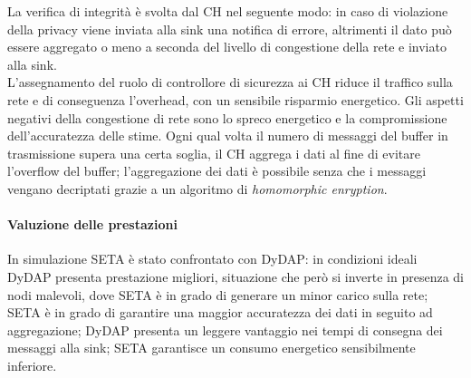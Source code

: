 	La verifica di integrità è svolta dal CH nel seguente modo:
	in caso di violazione della privacy viene inviata alla sink una notifica di errore,
	altrimenti il dato può essere aggregato o meno a seconda del livello di congestione della rete e inviato alla sink.\\
	L'assegnamento del ruolo di controllore di sicurezza ai CH riduce il traffico sulla rete e di conseguenza l'overhead, con un sensibile risparmio energetico.
	Gli aspetti negativi della congestione di rete sono lo spreco energetico e la compromissione dell'accuratezza delle stime.
	Ogni qual volta il numero di messaggi del buffer in trasmissione supera una certa soglia, il CH aggrega i dati al fine di evitare l'overflow del buffer; l'aggregazione dei dati è possibile senza che i messaggi vengano decriptati grazie a un algoritmo di \emph{homomorphic enryption}.
	
	 
\paragraph{Valuzione delle prestazioni}
	In simulazione SETA è stato confrontato con DyDAP: in condizioni ideali DyDAP presenta prestazione migliori, situazione che però si inverte in presenza di nodi malevoli, dove SETA è in grado di generare un minor carico sulla rete;
	SETA è in grado di garantire una maggior accuratezza dei dati in seguito ad aggregazione; 
	DyDAP presenta un leggere vantaggio nei tempi di consegna dei messaggi alla sink;
	SETA garantisce un consumo energetico sensibilmente inferiore.
	
	
	
	
	
	
	
	
	
	
	

	
